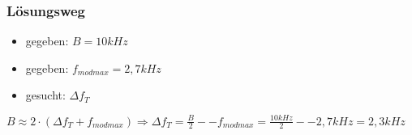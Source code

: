 \begin{frame}
\frametitle{Lösungsweg}
\begin{itemize}
  \item gegeben: $B = 10kHz$
  \item gegeben: $f_{mod max} = 2,7kHz$
  \item gesucht: $\Delta f_T$
  \end{itemize}
    \pause
    $B \approx 2 \cdot (\Delta f_T + f_{mod max}) \Rightarrow \Delta f_T = \frac{B}{2} -- f_{mod max} = \frac{10kHz}{2} -- 2,7kHz = 2,3kHz$



\end{frame}%
